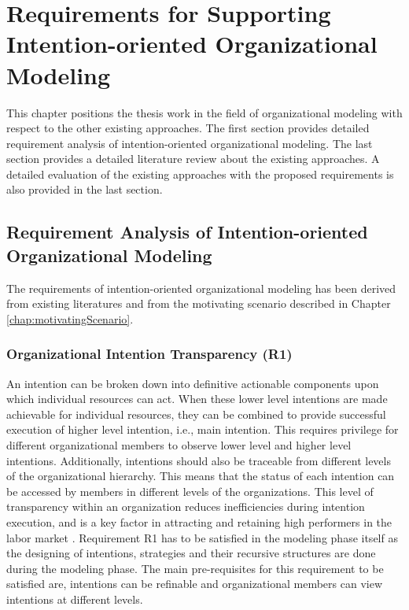 \chapter{Requirements for Supporting Intention-oriented Organizational Modeling}
\label{chap:analysis}
This chapter positions the thesis work in the field of organizational modeling with respect to the other existing approaches. The first section provides detailed requirement analysis of intention-oriented organizational modeling. The last section provides a detailed literature review about the existing approaches. A detailed evaluation of the existing approaches with the proposed requirements is also provided in the last section.

\section{Requirement Analysis of Intention-oriented Organizational Modeling}
\label{sec:requirementssupoorting}
The requirements of intention-oriented organizational modeling has been derived from existing literatures \cite{McManus2007, Mandic2010,Bleistein2006, Lacom, Brambilla2012} and from the motivating scenario described in Chapter \ref{chap:motivatingScenario}. 

\subsection{Organizational Intention Transparency (R1)}
An intention can be broken down into definitive actionable components upon which individual resources can act. When these lower level intentions are made achievable for individual resources, they can be combined to provide successful execution of higher level intention, i.e., main intention. This requires privilege for different organizational members to observe lower level and higher level intentions. Additionally, intentions should also be traceable from different levels of the organizational hierarchy. This means that the status of each intention can be accessed by members in different levels of the organizations. This level of transparency within an organization reduces inefficiencies during intention execution, and is a key factor in attracting and retaining high performers in the labor market \cite{McManus2007}. Requirement R1 has to be satisfied in the modeling phase itself as the designing of intentions, strategies and their recursive structures are done during the modeling phase. The main pre-requisites for this requirement to be satisfied are, intentions can be refinable and organizational members can view intentions at different levels. 

